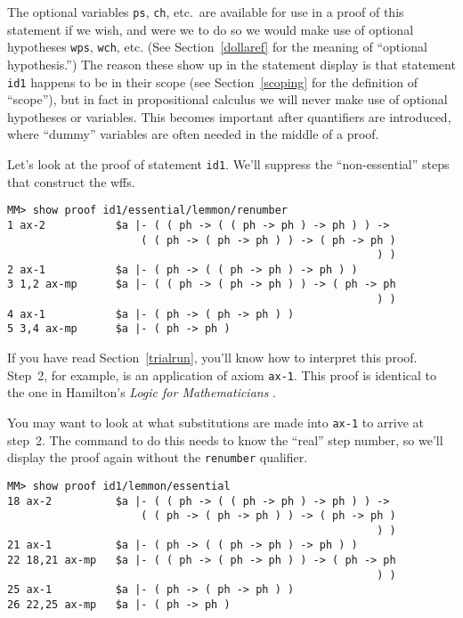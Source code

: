 The optional variables \texttt{ps}, \texttt{ch}, etc.\ are
available for use in a proof of this statement if we wish, and were we to do
so we would make use of optional hypotheses \texttt{wps}, \texttt{wch}, etc.  (See
Section~\ref{dollaref} for the meaning of ``optional
hypothesis.'') The reason these show up in the
statement display is that statement \texttt{id1} happens to be in their scope
(see Section~\ref{scoping} for the definition of ``scope''), but
in fact in propositional calculus we will never make use of optional
hypotheses or variables.  This becomes important after quantifiers are
introduced, where ``dummy'' variables are often needed
in the middle of a proof.

Let's look at the proof of statement \texttt{id1}.  We'll suppress the
``non-essential'' steps that construct the wffs.

\begin{verbatim}
MM> show proof id1/essential/lemmon/renumber
1 ax-2           $a |- ( ( ph -> ( ( ph -> ph ) -> ph ) ) ->
                     ( ( ph -> ( ph -> ph ) ) -> ( ph -> ph )
                                                          ) )
2 ax-1           $a |- ( ph -> ( ( ph -> ph ) -> ph ) )
3 1,2 ax-mp      $a |- ( ( ph -> ( ph -> ph ) ) -> ( ph -> ph
                                                          ) )
4 ax-1           $a |- ( ph -> ( ph -> ph ) )
5 3,4 ax-mp      $a |- ( ph -> ph )
\end{verbatim}

If you have read Section~\ref{trialrun}, you'll know how to interpret this
proof.  Step~2, for example, is an application of axiom \texttt{ax-1}.  This
proof is identical to the one in Hamilton's {\em Logic for Mathematicians}
\cite[p.~32]{Hamilton}.

You may want to look at what
substitutions are
made into \texttt{ax-1} to arrive at step~2.  The command to do this needs to
know the ``real'' step number, so we'll display the proof again without
the \texttt{renumber} qualifier.

\begin{verbatim}
MM> show proof id1/lemmon/essential
18 ax-2          $a |- ( ( ph -> ( ( ph -> ph ) -> ph ) ) ->
                     ( ( ph -> ( ph -> ph ) ) -> ( ph -> ph )
                                                          ) )
21 ax-1          $a |- ( ph -> ( ( ph -> ph ) -> ph ) )
22 18,21 ax-mp   $a |- ( ( ph -> ( ph -> ph ) ) -> ( ph -> ph
                                                          ) )
25 ax-1          $a |- ( ph -> ( ph -> ph ) )
26 22,25 ax-mp   $a |- ( ph -> ph )
\end{verbatim}

